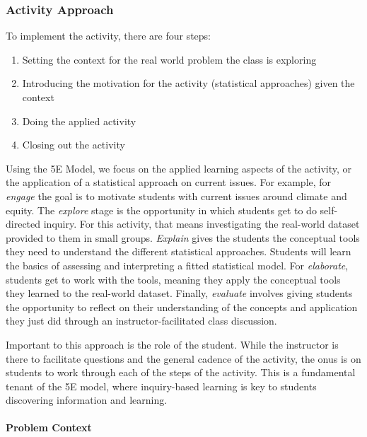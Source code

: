 \documentclass[
  12pt,
  letterpaper,
  DIV=11,
  numbers=noendperiod]{scrartcl}
\let\oldparagraph\paragraph
\renewcommand{\paragraph}[1]{\oldparagraph{#1}\mbox{}}
\providecommand{\tightlist}{%
  \setlength{\itemsep}{0pt}\setlength{\parskip}{0pt}}\usepackage{longtable,booktabs,array}
\begin{document}
\hypertarget{sec-activity-approach}{%
\subsubsection{Activity Approach}\label{sec-activity-approach}}

To implement the activity, there are four steps:

\begin{enumerate}
\def\labelenumi{\arabic{enumi}.}
\tightlist
\item
  Setting the context for the real world problem the class is exploring
\item
  Introducing the motivation for the activity (statistical approaches)
  given the context
\item
  Doing the applied activity
\item
  Closing out the activity
\end{enumerate}

Using the 5E Model, we focus on the applied learning aspects of the
activity, or the application of a statistical approach on current
issues. For example, for \emph{engage} the goal is to motivate students
with current issues around climate and equity. The \emph{explore} stage
is the opportunity in which students get to do self-directed inquiry.
For this activity, that means investigating the real-world dataset
provided to them in small groups. \emph{Explain} gives the students the
conceptual tools they need to understand the different statistical
approaches. Students will learn the basics of assessing and interpreting
a fitted statistical model. For \emph{elaborate}, students get to work
with the tools, meaning they apply the conceptual tools they learned to
the real-world dataset. Finally, \emph{evaluate} involves giving
students the opportunity to reflect on their understanding of the
concepts and application they just did through an instructor-facilitated
class discussion.

Important to this approach is the role of the student. While the
instructor is there to facilitate questions and the general cadence of
the activity, the onus is on students to work through each of the steps
of the activity. This is a fundamental tenant of the 5E model, where
inquiry-based learning is key to students discovering information and
learning.

\hypertarget{sec-prob-context}{%
\paragraph{Problem Context}\label{sec-prob-context}}
\end{document}
